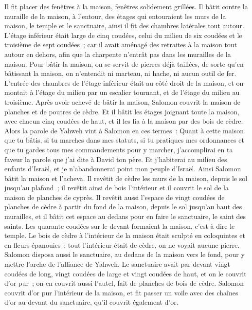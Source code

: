 \begin{multicols}{2}
Il fit placer des fenêtres à la maison, fenêtres solidement grillées.
Il bâtit contre la muraille de la maison, à l'entour, des étages qui entouraient les murs de la maison, le temple et le sanctuaire, ainsi il fit des chambres latérales tout autour.
L'étage inférieur était large de cinq coudées, celui du milieu de six coudées et le troisième de sept coudées~; car il avait aménagé des retraites à la maison tout autour en dehors, afin que la charpente n'entrât pas dans les murailles de la maison.
Pour bâtir la maison, on se servit de pierres déjà taillées, de sorte qu'en bâtissant la maison, on n'entendit ni marteau, ni hache, ni aucun outil de fer.
L'entrée des chambres de l'étage inférieur était au côté droit de la maison, et on montait à l'étage du milieu par un escalier tournant, et de l'étage du milieu au troisième.
Après avoir achevé de bâtir la maison, Salomon couvrit la maison de planches et de poutres de cèdre.
Et il bâtit les étages joignant toute la maison, avec chacun cinq coudées de haut, et il les lia à la maison par des bois de cèdre.
Alors la parole de Yahweh vint à Salomon en ces termes~:
Quant à cette maison que tu bâtis, si tu marches dans mes statuts, si tu pratiques mes ordonnances et que tu gardes tous mes commandements pour y marcher, j'accomplirai en ta faveur la parole que j'ai dite à David ton père.
Et j'habiterai au milieu des enfants d'Israël, et je n'abandonnerai point mon peuple d'Israël.
Ainsi Salomon bâtit la maison et l'acheva.
Il revêtit de cèdre les murs de la maison, depuis le sol jusqu'au plafond~; il revêtit ainsi de bois l'intérieur et il couvrit le sol de la maison de planches de cyprès.
Il revêtit aussi l'espace de vingt coudées de planches de cèdre à partir du fond de la maison, depuis le sol jusqu'au haut des murailles, et il bâtit cet espace au dedans pour en faire le sanctuaire, le saint des saints.
Les quarante coudées sur le devant formaient la maison, c'est-à-dire le temple.
Le bois de cèdre à l'intérieur de la maison était sculpté en coloquintes et en fleurs épanouies~; tout l'intérieur était de cèdre, on ne voyait aucune pierre.
Salomon disposa aussi le sanctuaire, au dedans de la maison vers le fond, pour y mettre l'arche de l'alliance de Yahweh.
Le sanctuaire avait par devant vingt coudées de long, vingt coudées de large et vingt coudées de haut, et on le couvrit d'or pur~; on en couvrit aussi l'autel, fait de planches de bois de cèdre.
Salomon couvrit d'or pur l'intérieur de la maison, et fit passer un voile avec des chaînes d'or au-devant du sanctuaire, qu'il couvrit également d'or.

\end{multicols}
